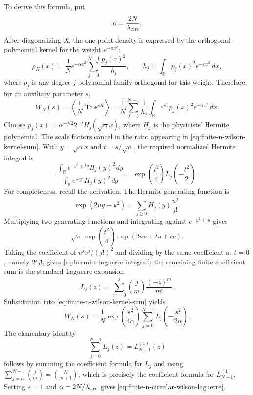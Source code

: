 To derive this formula, put
\[
  \alpha=\frac{2N}{\lambda_{\rm circ}} .
\]
After diagonalizing \(X\), the one-point density is expressed by the
orthogonal-polynomial kernel for the weight \(e^{-\alpha x^2}\):
\begin{equation}
  \rho_N(x)
  =
  \frac1N e^{-\alpha x^2}
  \sum_{j=0}^{N-1}\frac{p_j(x)^2}{h_j},
  \qquad
  h_j=\int_{\mathbb R}p_j(x)^2e^{-\alpha x^2}\,dx ,
  \label{eq:finite-n-hermite-density-kernel}
\end{equation}
where \(p_j\) is any degree-\(j\) polynomial family orthogonal for this
weight.  Therefore, for an auxiliary parameter \(s\),
\begin{equation}
  W_N(s)
  =
  \left\langle
    \frac1N\operatorname{Tr}\ee^{sX}
  \right\rangle
  =
  \frac1N
  \sum_{j=0}^{N-1}
  \frac1{h_j}\int_{\mathbb R}
  e^{sx}p_j(x)^2e^{-\alpha x^2}\,dx .
  \label{eq:finite-n-wilson-kernel-sum}
\end{equation}
Choose \(p_j(x)=\alpha^{-j/2}2^{-j}H_j(\sqrt\alpha x)\), where \(H_j\) is the
physicists' Hermite polynomial.  The scale factors cancel in the ratio
appearing in \eqref{eq:finite-n-wilson-kernel-sum}.  With
\(y=\sqrt\alpha x\) and \(t=s/\sqrt\alpha\), the required normalized Hermite
integral is
\begin{equation}
  \frac{\int_{\mathbb R} e^{-y^2+ty}H_j(y)^2\,dy}
       {\int_{\mathbb R} e^{-y^2}H_j(y)^2\,dy}
  =
  \exp\!\left(\frac{t^2}{4}\right)
  L_j\!\left(-\frac{t^2}{2}\right).
  \label{eq:hermite-laguerre-integral}
\end{equation}
For completeness, recall the derivation.  The Hermite generating function is
\[
  \exp(2uy-u^2)=\sum_{j\ge0}H_j(y)\frac{u^j}{j!}.
\]
Multiplying two generating functions and integrating against
\(e^{-y^2+ty}\) gives
\[
  \sqrt\pi\,
  \exp\!\left(\frac{t^2}{4}\right)
  \exp\!\left(2uv+tu+tv\right).
\]
Taking the coefficient of \(u^jv^j/(j!)^2\) and dividing by the same
coefficient at \(t=0\), namely \(2^j j!\), gives
\eqref{eq:hermite-laguerre-integral}; the remaining finite coefficient sum is
the standard Laguerre expansion
\[
  L_j(z)=\sum_{m=0}^{j}\binom{j}{m}\frac{(-z)^m}{m!}.
  \]
Substitution into \eqref{eq:finite-n-wilson-kernel-sum} yields
\begin{equation}
  W_N(s)
  =
  \frac1N
  \exp\!\left(\frac{s^2}{4\alpha}\right)
  \sum_{j=0}^{N-1}
  L_j\!\left(-\frac{s^2}{2\alpha}\right).
  \label{eq:finite-n-wilson-laguerre-sum}
\end{equation}
The elementary identity
\[
  \sum_{j=0}^{N-1}L_j(z)=L_{N-1}^{(1)}(z)
\]
follows by summing the coefficient formula for \(L_j\) and using
\(\sum_{j=m}^{N-1}\binom jm=\binom N{m+1}\), which is precisely the
coefficient formula for \(L_{N-1}^{(1)}\).  Setting \(s=1\) and
\(\alpha=2N/\lambda_{\rm circ}\) gives
\eqref{eq:finite-n-circular-wilson-laguerre}.

